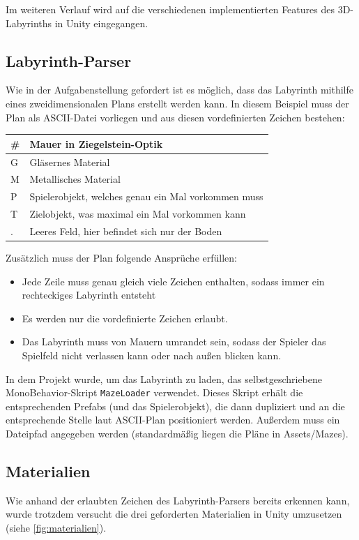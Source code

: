 \documentclass[a4paper]{article}
\begin{document}
Im weiteren Verlauf wird auf die verschiedenen implementierten Features des 3D-Labyrinths in Unity eingegangen.

\subsection{Labyrinth-Parser}
Wie in der Aufgabenstellung gefordert ist es möglich, dass das Labyrinth mithilfe eines zweidimensionalen Plans erstellt werden kann. In diesem Beispiel muss der Plan als ASCII-Datei vorliegen und aus diesen vordefinierten Zeichen bestehen:

\begin{center}
	\begin{tabular}{|l|l|}
		\hline
		\# & Mauer in Ziegelstein-Optik\\
		\hline
		G & Gläsernes Material \\
		\hline
		M & Metallisches Material\\
		\hline
		P & Spielerobjekt, welches genau ein Mal vorkommen muss\\
		\hline
		T & Zielobjekt, was maximal ein Mal vorkommen kann\\
		\hline
		. & Leeres Feld, hier befindet sich nur der Boden\\
		\hline
	\end{tabular}
\end{center}




Zusätzlich muss der Plan folgende Ansprüche erfüllen:
\begin{itemize}
	\item Jede Zeile muss genau gleich viele Zeichen enthalten, sodass immer ein rechteckiges Labyrinth entsteht
	\item Es werden nur die vordefinierte Zeichen erlaubt.
	\item Das Labyrinth muss von Mauern umrandet sein, sodass der Spieler das Spielfeld nicht verlassen kann oder nach außen blicken kann.
\end{itemize}

In dem Projekt wurde, um das Labyrinth zu laden, das selbstgeschriebene MonoBehavior-Skript \texttt{MazeLoader} verwendet. Dieses Skript erhält die entsprechenden Prefabs (und das Spielerobjekt), die dann dupliziert und an die entsprechende Stelle laut ASCII-Plan positioniert werden. Außerdem muss ein Dateipfad angegeben werden (standardmäßig liegen die Pläne in Assets/Mazes).


\subsection{Materialien}
Wie anhand der erlaubten Zeichen des Labyrinth-Parsers bereits erkennen kann, wurde trotzdem versucht die drei geforderten Materialien in Unity umzusetzen (siehe \autoref{fig:materialien}). 
\end{document}
